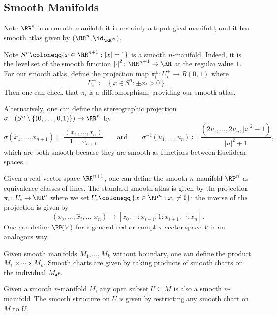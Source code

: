 \documentclass{article}
\begin{document}
\subsection{Smooth Manifolds}
\begin{example}
	Note $\RR^n$ is a smooth manifold: it is certainly a topological manifold, and it has smooth atlas given by $(\RR^n,{\id_{\RR^N}})$.
\end{example}
\begin{example}
	Note $S^n\coloneqq\{x\in\RR^{n+1}:\left|x\right|=1\}$ is a smooth $n$-manifold. Indeed, it is the level set of the smooth function $\left|\cdot\right|^2\colon\RR^{n+1}\to\RR$ at the regular value $1$. For our smooth atlas, define the projection map $\pi_i^\pm\colon U_i^\pm\to B(0,1)$ where
	\[U_i^\pm\coloneqq\left\{x\in S^n:\pm x_i>0\right\}.\]
	Then one can check that $\pi_i$ is a diffeomorphism, providing our smooth atlas.

	Alternatively, one can define the stereographic projection $\sigma\colon\left(S^n\setminus\{(0,\ldots,0,1)\}\right)\to\RR^n$ by
	\[\sigma(x_1,\ldots,x_{n+1})\coloneqq\frac{(x_1,\ldots,x_n)}{1-x_{n+1}}\qquad\text{and}\qquad\sigma^{-1}(u_1,\ldots,u_n)\coloneqq\frac{\left(2u_1,\ldots,2u_n,\left|u\right|^2-1\right)}{\left|u\right|^2+1},\]
	which are both smooth because they are smooth as functions between Euclidean spaces.
\end{example}
\begin{example}
	Given a real vector space $\RR^{n+1}$, one can define the smooth $n$-manifold $\RP^n$ as equivalence classes of lines. The standard smooth atlas is given by the projection $\pi_i\colon U_i\to\RR^n$ where we set $U_i\coloneqq\left\{x\in\RP^n:x_i\ne0\right\}$; the inverse of the projection is given by
	\[(x_0,\ldots,\widehat x_i,\ldots,x_n)\mapsto[x_0:\cdots:x_{i-1}:1:x_{i+1}:\cdots:x_n].\]
	One can define $\PP(V)$ for a general real or complex vector space $V$ in an analogous way.
\end{example}
\begin{example}
	Given smooth manifolds $M_1,\ldots,M_k$ without boundary, one can define the product $M_1\times\cdots\times M_k$. Smooth charts are given by taking products of smooth charts on the individual $M_\bullet$s.
\end{example}
\begin{example}
	Given a smooth $n$-manifold $M$, any open subset $U\subseteq M$ is also a smooth $n$-manifold. The smooth structure on $U$ is given by restricting any smooth chart on $M$ to $U$.
\end{example}
\end{document}
